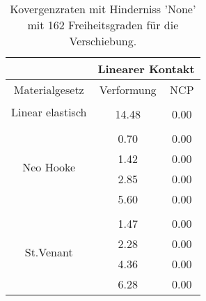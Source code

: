 \begin{table} 
\centering 
\begin{tabular}{c|cc|} 
\cline{2-3} 
 & \multicolumn{2}{|c|}{Linearer Kontakt} \\ 
\hline 
\multicolumn{1}{|c|}{Materialgesetz} & \multicolumn{1}{c|}{Verformung} & \multicolumn{1}{c|}{NCP} \\ 
\hline 
\multicolumn{1}{|c|}{\multirow{2}{*}{Linear elastisch}} &\multicolumn{1}{|c|}{} & \multicolumn{1}{|c|}{} \\ 
\multicolumn{1}{|c|}{} & \multicolumn{1}{|c|}{     14.48} & \multicolumn{1}{|c|}{      0.00} \\ 
\hline 
\multicolumn{1}{|c|}{\multirow{5}{*}{Neo Hooke}} &\multicolumn{1}{|c|}{} & \multicolumn{1}{|c|}{} \\ 
\multicolumn{1}{|c|}{} & \multicolumn{1}{|c|}{      0.70} & \multicolumn{1}{|c|}{      0.00} \\ 
\multicolumn{1}{|c|}{} & \multicolumn{1}{|c|}{      1.42} & \multicolumn{1}{|c|}{      0.00} \\ 
\multicolumn{1}{|c|}{} & \multicolumn{1}{|c|}{      2.85} & \multicolumn{1}{|c|}{      0.00} \\ 
\multicolumn{1}{|c|}{} & \multicolumn{1}{|c|}{      5.60} & \multicolumn{1}{|c|}{      0.00} \\ 
\hline 
\multicolumn{1}{|c|}{\multirow{5}{*}{St.Venant}} &\multicolumn{1}{|c|}{} & \multicolumn{1}{|c|}{} \\ 
\multicolumn{1}{|c|}{} & \multicolumn{1}{|c|}{      1.47} & \multicolumn{1}{|c|}{      0.00} \\ 
\multicolumn{1}{|c|}{} & \multicolumn{1}{|c|}{      2.28} & \multicolumn{1}{|c|}{      0.00} \\ 
\multicolumn{1}{|c|}{} & \multicolumn{1}{|c|}{      4.36} & \multicolumn{1}{|c|}{      0.00} \\ 
\multicolumn{1}{|c|}{} & \multicolumn{1}{|c|}{      6.28} & \multicolumn{1}{|c|}{      0.00} \\ 
\hline 
\end{tabular}\caption{Kovergenzraten mit Hinderniss 'None' mit 162 Freiheitsgraden für die Verschiebung.}\label{tab:Rate_None_level2}
\end{table} 
